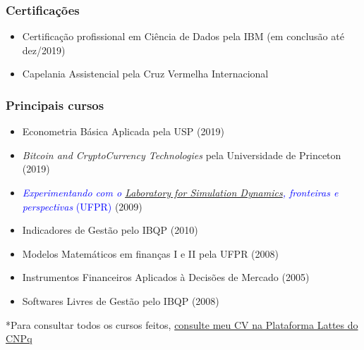\documentclass{beamer}
\begin{document}

\begin{frame}
\frametitle{Certificações}

\footnotesize
\begin{itemize}
    \item Certificação profissional em Ciência de Dados pela IBM (em conclusão até dez/2019) 
    
    
    \item Capelania Assistencial pela Cruz Vermelha Internacional
\end{itemize}

\end{frame}
\begin{frame}
\frametitle{Principais cursos}

\footnotesize
\begin{itemize}
    \item Econometria Básica Aplicada pela USP (2019)
    \item \textit{Bitcoin and CryptoCurrency Technologies} pela Universidade de Princeton (2019)
    \item \textcolor{blue}{\textit{Experimentando com o \href{https://www.ufpr.br/portalufpr/eventos/curso-de-extensao-economia-e-complexidade-modelagem-baseada-em-agentes-com-lsd-sera-promovido-de-17-a-19-de-julho/}{Laboratory for Simulation Dynamics}, fronteiras e perspectivas} (UFPR)} (2009)
    \item Indicadores de Gestão pelo IBQP (2010)
    \item Modelos Matemáticos em finanças I e II pela UFPR (2008)
    \item Instrumentos Financeiros Aplicados à Decisões de Mercado (2005)
    \item Softwares Livres de Gestão pelo IBQP (2008)
\end{itemize}
*Para consultar todos os cursos feitos, \textcolor{blue}{\href{http://lattes.cnpq.br/3532649625879285}{consulte meu CV na Plataforma Lattes do CNPq}}

\end{frame}
\end{document}
